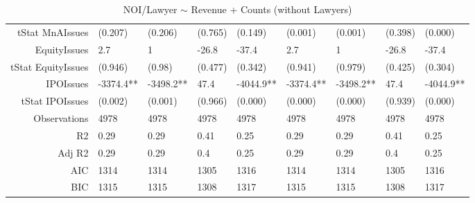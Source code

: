 \begin{table}[ht]
\begin{tabular}{rllllllll}
  tStat MnAIssues & (0.207) & (0.206) & (0.765) & (0.149) & (0.001) & (0.001) & (0.398) & (0.000) \\ 
  EquityIssues & 2.7 & 1 & -26.8 & -37.4 & 2.7 & 1 & -26.8 & -37.4 \\ 
  tStat EquityIssues & (0.946) & (0.98) & (0.477) & (0.342) & (0.941) & (0.979) & (0.425) & (0.304) \\ 
  IPOIssues & -3374.4** & -3498.2** & 47.4 & -4044.9** & -3374.4** & -3498.2** & 47.4 & -4044.9** \\ 
  tStat IPOIssues & (0.002) & (0.001) & (0.966) & (0.000) & (0.000) & (0.000) & (0.939) & (0.000) \\ 
  Observations & 4978 & 4978 & 4978 & 4978 & 4978 & 4978 & 4978 & 4978 \\ 
  R2 & 0.29 & 0.29 & 0.41 & 0.25 & 0.29 & 0.29 & 0.41 & 0.25 \\ 
  Adj R2 & 0.29 & 0.29 & 0.4 & 0.25 & 0.29 & 0.29 & 0.4 & 0.25 \\ 
  AIC & 1314 & 1314 & 1305 & 1316 & 1314 & 1314 & 1305 & 1316 \\ 
  BIC & 1315 & 1315 & 1308 & 1317 & 1315 & 1315 & 1308 & 1317 \\ 
   \hline
\end{tabular}
\caption{NOI/Lawyer $\sim$ Revenue + Counts (without Lawyers)} 
\end{table}
